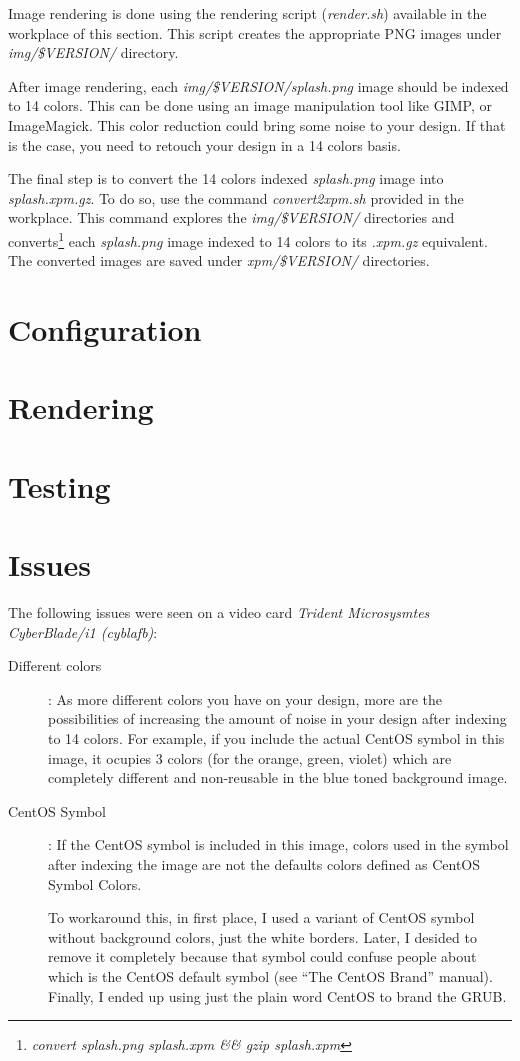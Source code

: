 \documentclass{article}
\begin{document}
Image rendering is done using the rendering script (\emph{render.sh})
available in the workplace of this section.  This script creates
the appropriate PNG images under \emph{img/\$VERSION/}
directory.

After image rendering, each \emph{img/\$VERSION/splash.png} image
should be indexed to 14 colors. This can be done using an image
manipulation tool like GIMP, or ImageMagick.  This color reduction
could bring some noise to your design. If that is the case, you need
to retouch your design in a 14 colors basis.

The final step is to convert the 14 colors indexed \emph{splash.png}
image into \emph{splash.xpm.gz}. To do so, use the command
\emph{convert2xpm.sh} provided in the workplace. This command
explores the \emph{img/\$VERSION/} directories and
converts\footnote{\emph{convert splash.png splash.xpm \&\& gzip
splash.xpm}} each \emph{splash.png} image indexed to 14 colors to its
\emph{.xpm.gz} equivalent. The converted images are saved under
\emph{xpm/\$VERSION/} directories. 

\section{Configuration}
\section{Rendering}
\section{Testing}
\section{Issues}

The following issues were seen on a video card \emph{Trident
Microsysmtes CyberBlade/i1 (cyblafb)}:

\begin{description}

\item[Different colors]: As more different colors you have on your
design, more are the possibilities of increasing the amount of noise
in your design after indexing to 14 colors. For example, if you
include the actual CentOS symbol in this image, it ocupies 3 colors
(for the orange, green, violet) which are completely different and
non-reusable in the blue toned background image.

\item [CentOS Symbol]: If the CentOS symbol is included in
this image, colors used in the symbol after indexing the image
are not the defaults colors defined as CentOS Symbol Colors. 

To workaround this, in first place, I used a variant of CentOS symbol
without background colors, just the white borders. Later, I desided to
remove it completely because that symbol could confuse people about
which is the CentOS default symbol (see ``The CentOS Brand'' manual).
Finally, I ended up using just the plain word CentOS to brand the
GRUB. 

\end{description}


\end{document}
